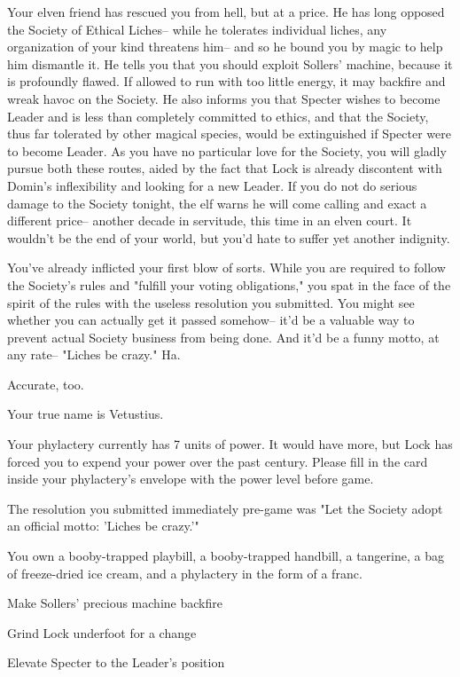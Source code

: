 \documentclass[char]{Sel}
\begin{document}
Your elven friend has rescued you from hell, but at a price. He has long opposed the Society of Ethical Liches-- while he tolerates individual liches, any organization of your kind threatens him-- and so he bound you by magic to help him dismantle it. He tells you that you should exploit Sollers' machine, because it is profoundly flawed. If allowed to run with too little energy, it may backfire and wreak havoc on the Society. He also informs you that Specter wishes to become Leader and is less than completely committed to ethics, and that the Society, thus far tolerated by other magical species, would be extinguished if Specter were to become Leader. As you have no particular love for the Society, you will gladly pursue both these routes, aided by the fact that Lock is already discontent with Domin's inflexibility and looking for a new Leader. If you do not do serious damage to the Society tonight, the elf warns he will come calling and exact a different price-- another decade in servitude, this time in an elven court. It wouldn't be the end of your world, but you'd hate to suffer yet another indignity.

You've already inflicted your first blow of sorts. While you are required to follow the Society's rules and "fulfill your voting obligations," you spat in the face of the spirit of the rules with the useless resolution you submitted. You might see whether you can actually get it passed somehow-- it'd be a valuable way to prevent actual Society business from being done. And it'd be a funny motto, at any rate-- "Liches be crazy." Ha.

Accurate, too.

\begin{itemz}[Notes]
  \item Your true name is Vetustius.
      \item Your phylactery currently has 7 units of power. It would have more, but Lock has forced you to expend your power over the past century. Please fill in the card inside your phylactery's envelope with the power level before game.
  \item The resolution you submitted immediately pre-game was "Let the Society adopt an official motto: 'Liches be crazy.'"
  \item You own a booby-trapped playbill, a booby-trapped handbill, a tangerine, a bag of freeze-dried ice cream, and a phylactery in the form of a franc.
    \end{itemz}
    
  
  
 \begin{itemz}[Goals]
\item Make Sollers' precious machine backfire
\item Grind Lock underfoot for a change
\item Elevate Specter to the Leader's position
\end{itemz}
\end{document}
